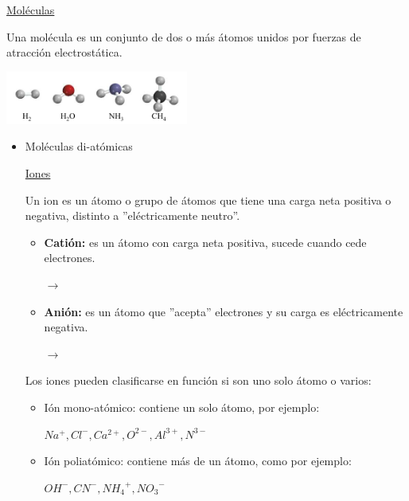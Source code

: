            \begin{center} \underline{Moléculas} \end{center}
                \indent Una molécula es un conjunto de dos o más átomos unidos por fuerzas de atracción electrostática.
                \begin{center} \includegraphics[width=6cm]{./imagenes/moleculas.png} \end{center}
                \begin{itemize}
                    \item Moléculas di-atómicas 

            \begin{center} \underline{Iones} \end{center}
                \indent Un ion es un átomo o grupo de átomos que tiene una carga neta positiva o negativa, distinto a ''eléctricamente neutro''.
                \begin{itemize}
                    \item \textbf{Catión:} es un átomo con carga neta positiva, sucede cuando cede electrones.
                        \begin{center}  $\rightarrow$  \end{center}
                    \item \textbf{Anión:} es un átomo que ''acepta'' electrones y su carga es eléctricamente negativa.
                        \begin{center}  $\rightarrow$  \end{center}
                \end{itemize}
                \indent Los iones pueden clasificarse en función si son uno solo átomo o varios:
                \begin{itemize} 
                    \item Ión mono-atómico: contiene un solo átomo, por ejemplo:
                        \begin{center} ${Na^+},{Cl^-},{Ca^{2+}},{O^{2-}},{Al^{3+}},{N^{3-}}$ \end{center}
                    \item Ión poliatómico: contiene más de un átomo, como por ejemplo:
                        \begin{center} ${OH^-},{CN^-},{{NH_4}^{+}},{{NO_3}^{-}}$ \end{center}
                \end{itemize}
                \saltoPag


\end{itemize}
